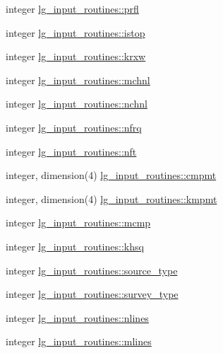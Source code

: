 \begin{DoxyCompactItemize}
\item 
integer \hyperlink{namespacelg__input__routines_a22e8c0e456440e4c42347d12a3bca9fb}{lg\+\_\+input\+\_\+routines\+::prfl}
\item 
integer \hyperlink{namespacelg__input__routines_a23b2611e5e3842861e03d1b579dc49aa}{lg\+\_\+input\+\_\+routines\+::istop}
\item 
integer \hyperlink{namespacelg__input__routines_a6e9f307b4197279d1b7e3343d2ef2ae0}{lg\+\_\+input\+\_\+routines\+::krxw}
\item 
integer \hyperlink{namespacelg__input__routines_afe38ea783532fc3907b8e2a14dca9f56}{lg\+\_\+input\+\_\+routines\+::mchnl}
\item 
integer \hyperlink{namespacelg__input__routines_ab0df43bcb1062d866441722ec2cb60be}{lg\+\_\+input\+\_\+routines\+::nchnl}
\item 
integer \hyperlink{namespacelg__input__routines_a81f61700f8b72e38a0a2956ff7e34383}{lg\+\_\+input\+\_\+routines\+::nfrq}
\item 
integer \hyperlink{namespacelg__input__routines_a7699250d511dad1cbb727dafc82df908}{lg\+\_\+input\+\_\+routines\+::nft}
\item 
integer, dimension(4) \hyperlink{namespacelg__input__routines_aa1e90821ade680361e1ae7f091fe973b}{lg\+\_\+input\+\_\+routines\+::cmpmt}
\item 
integer, dimension(4) \hyperlink{namespacelg__input__routines_a85f616adbe6187683a55c9ad1d0515dd}{lg\+\_\+input\+\_\+routines\+::kmpmt}
\item 
integer \hyperlink{namespacelg__input__routines_a102c576e29efd44cb401abd2a7b19f94}{lg\+\_\+input\+\_\+routines\+::mcmp}
\item 
integer \hyperlink{namespacelg__input__routines_a1dd929af54eac2b06f42ee3e4641bea1}{lg\+\_\+input\+\_\+routines\+::khsq}
\item 
integer \hyperlink{namespacelg__input__routines_a5e67c1ccd96e60a3baac0f052f42b694}{lg\+\_\+input\+\_\+routines\+::source\+\_\+type}
\item 
integer \hyperlink{namespacelg__input__routines_a768c5e94c3ddc2f0fc0bdd032c794cc6}{lg\+\_\+input\+\_\+routines\+::survey\+\_\+type}
\item 
integer \hyperlink{namespacelg__input__routines_ae13aeece4a34e71311078fd0d3f07861}{lg\+\_\+input\+\_\+routines\+::nlines}
\item 
integer \hyperlink{namespacelg__input__routines_ab9031c82464776c476a344366cd1453e}{lg\+\_\+input\+\_\+routines\+::mlines}
\item 

\end{DoxyCompactItemize}
